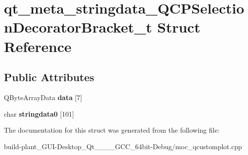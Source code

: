 \hypertarget{structqt__meta__stringdata__QCPSelectionDecoratorBracket__t}{}\section{qt\+\_\+meta\+\_\+stringdata\+\_\+\+Q\+C\+P\+Selection\+Decorator\+Bracket\+\_\+t Struct Reference}
\label{structqt__meta__stringdata__QCPSelectionDecoratorBracket__t}
\subsection*{Public Attributes}
\begin{DoxyCompactItemize}
\item 
\mbox{\label{structqt__meta__stringdata__QCPSelectionDecoratorBracket__t_a3b64cfff2eed66fb56c3b3a8d04dbbbe}} 
Q\+Byte\+Array\+Data {\bfseries data} \mbox{[}7\mbox{]}
\item 
\mbox{\label{structqt__meta__stringdata__QCPSelectionDecoratorBracket__t_a9fdc0589eeaa19fcf4e22afbdbd579cd}} 
char {\bfseries stringdata0} \mbox{[}101\mbox{]}
\end{DoxyCompactItemize}


The documentation for this struct was generated from the following file\+:\begin{DoxyCompactItemize}
\item 
build-\/plant\+\_\+\+G\+U\+I-\/\+Desktop\+\_\+\+Qt\+\_\+\_\+\_\+\_\+\+G\+C\+C\+\_\+64bit-\/\+Debug/moc\+\_\+qcustomplot.\+cpp\end{DoxyCompactItemize}
